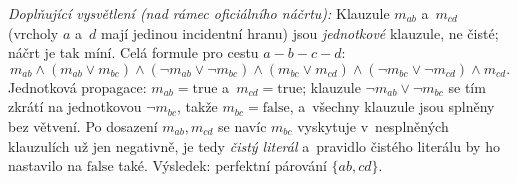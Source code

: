 \medskip
\noindent\textit{Doplňující vysvětlení (nad rámec oficiálního náčrtu):} Klauzule $m_{ab}$ a~$m_{cd}$ (vrcholy $a$ a~$d$ mají jedinou incidentní hranu) jsou \emph{jednotkové} klauzule, ne čisté; náčrt je tak míní. Celá formule pro cestu $a-b-c-d$:
\[ m_{ab}\wedge(m_{ab}\vee m_{bc})\wedge(\neg m_{ab}\vee\neg m_{bc})\wedge(m_{bc}\vee m_{cd})\wedge(\neg m_{bc}\vee\neg m_{cd})\wedge m_{cd}. \]
Jednotková propagace: $m_{ab}=\mathrm{true}$ a~$m_{cd}=\mathrm{true}$; klauzule $\neg m_{ab}\vee\neg m_{bc}$ se tím zkrátí na jednotkovou $\neg m_{bc}$, takže $m_{bc}=\mathrm{false}$, a~všechny klauzule jsou splněny bez větvení. Po dosazení $m_{ab},m_{cd}$ se navíc $m_{bc}$ vyskytuje v~nesplněných klauzulích už jen negativně, je tedy \emph{čistý literál} a~pravidlo čistého literálu by ho nastavilo na $\mathrm{false}$ také. Výsledek: perfektní párování $\{ab,cd\}$.
